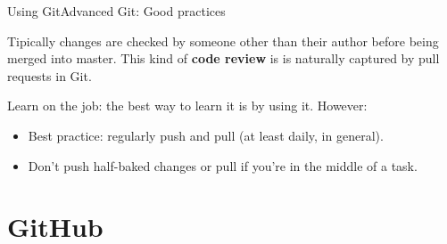 \documentclass[10pt,compress]{beamer} %
\begin{document}
\begin{frame}{Using Git}{Advanced Git: Good practices}

Tipically changes are checked by someone other than their
author before being merged into master. This kind of \textbf{code review} is is naturally captured by pull requests in Git.

Learn on the job: the best way to learn it is by using it. However:

\begin{itemize}
  \item Best practice: regularly push and pull (at least daily, in general).
  \item Don't push half-baked changes or pull if you're in the middle of a task.
\end{itemize}

\end{frame}


\section{GitHub}
\end{document}
